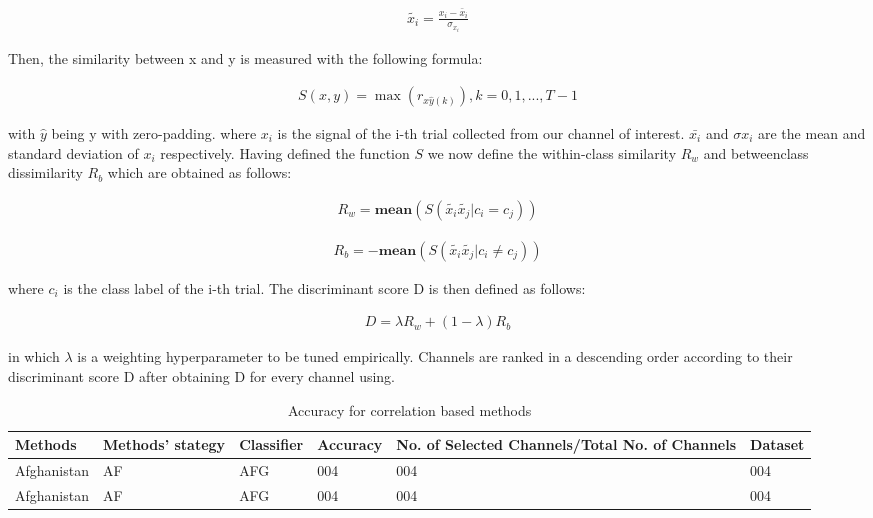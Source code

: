 \documentclass{Configuration_Files/PoliMi3i_thesis}
\begin{document}
\begin{align}
	\tilde{x_i} = \frac{x_i - \bar x_i}{\sigma_{x_i}}
   \label{eq:XCDC3}
\end{align}


Then, the similarity between x and y is measured with the following formula:

\begin{align}
	S(x,y) = \max(r_{x\hat{y}(k)}), k=0,1,..., T - 1 
   \label{eq:XCDC2}
\end{align}

with $\hat{y}$ being y with zero-padding.
where $x_i$ is the signal of the i-th trial collected from our channel of interest. $\bar{x_i}$ and $\sigma{x_i}$ are
the mean and standard deviation of $x_i$ respectively.
Having defined the function $S$ we now define the within-class similarity $R_w$ and betweenclass dissimilarity $R_b$ which are obtained as follows:

\begin{align}
	R_w = \mathbf{mean}(S(\tilde{x_i}\tilde{x_j}| c_i = c_j))
   \label{eq:XCDC4}
\end{align}

\begin{align}
	R_b = -\mathbf{mean}(S(\tilde{x_i}\tilde{x_j}| c_i \neq  c_j))
   \label{eq:XCDC5}
\end{align}

where $c_i$ is the class label of the i-th trial. The discriminant score D is then defined as follows:

\begin{align}
	D = \lambda R_w + (1-\lambda)R_b
   \label{eq:XCDC6}
\end{align}

in which $\lambda$ is a weighting hyperparameter to be tuned empirically.
Channels are ranked in a descending order according to their discriminant score D after obtaining D for every channel using.

\begin{table}[H]
	\caption{Accuracy for correlation based methods}
	\begin{tabular}{|p{2cm}|p{2cm}|p{2cm}|p{2cm}|p{2cm}|p{2cm}|}
	\hline
	Methods & Methods' stategy & Classifier &Accuracy&No. of Selected Channels/Total No. of Channels&Dataset\\
	\hline
	Afghanistan   & AF    &AFG&   004&   004&   004\\
	Afghanistan   & AF    &AFG&   004&   004&   004\\
	\hline
	\end{tabular}
	\end{table}
\end{document}
